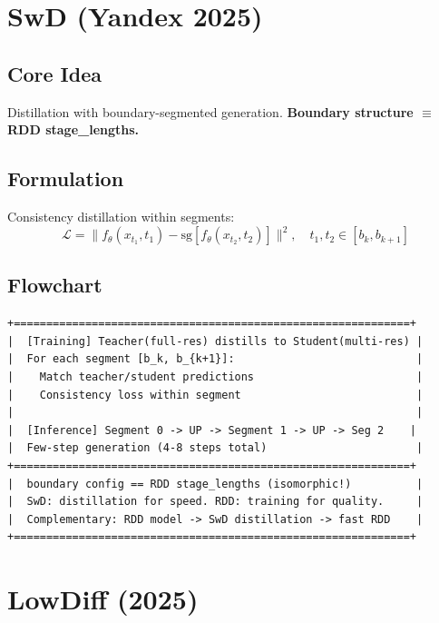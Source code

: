 \documentclass[11pt, a4paper]{article}
\begin{document}
\newpage
\section{SwD (Yandex 2025)}

\subsection{Core Idea}
Distillation with boundary-segmented generation. \textbf{Boundary structure $\equiv$ RDD stage\_lengths.}

\subsection{Formulation}

Consistency distillation within segments:
\begin{equation}
    \mathcal{L} = \|f_\theta(x_{t_1}, t_1) - \mathrm{sg}[f_\theta(x_{t_2}, t_2)]\|^2, \quad t_1, t_2 \in [b_k, b_{k+1}]
\end{equation}

\subsection{Flowchart}

\begin{lstlisting}[style=flowchart, caption={SwD Pipeline}]
+=============================================================+
|  [Training] Teacher(full-res) distills to Student(multi-res) |
|  For each segment [b_k, b_{k+1}]:                            |
|    Match teacher/student predictions                         |
|    Consistency loss within segment                           |
|                                                              |
|  [Inference] Segment 0 -> UP -> Segment 1 -> UP -> Seg 2    |
|  Few-step generation (4-8 steps total)                       |
+=============================================================+
|  boundary config == RDD stage_lengths (isomorphic!)          |
|  SwD: distillation for speed. RDD: training for quality.     |
|  Complementary: RDD model -> SwD distillation -> fast RDD    |
+=============================================================+
\end{lstlisting}

\newpage
\section{LowDiff (2025)}
\end{document}
